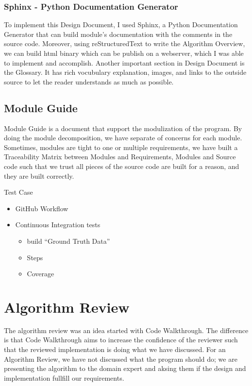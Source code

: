 \subsubsection{Sphinx - Python Documentation Generator}
To implement this Design Document, I used Sphinx, a Python Documentation Generator that can build module's documentation with the comments in the source code. Moreover, using reStructuredText to write the Algorithm Overview, we can build html binary which can be publish on a webserver, which I was able to implement and accomplish. Another important section in Design Document is the Glossary. It has rich vocubulary explanation, images, and links to the outside source to let the reader understands as much as possible.

\subsection{Module Guide}
Module Guide is a document that support the modulization of the program. By doing the module decomposition, we have separate of concerns for each module. Sometimes, modules are tight to one or multiple requirements, we have built a Traceability Matrix between Modules and Requirements, Modules and Source code such that we trust all pieces of the source code are built for a reason, and they are built correctly.


Test Case
\begin{itemize}
\item GitHub Workflow
\item Continuous Integration tests
\begin{itemize}
\item build ``Ground Truth Data''
\item Steps
\item Coverage
\end{itemize}
\end{itemize}

\section{Algorithm Review}

The algorithm review was an idea started with Code Walkthrough. The difference is that Code Walkthrough aims to increase the confidence of the reviewer such that the reviewed implementation is doing what we have discussed. For an Algorithm Review, we have not discussed what the program should do; we are presenting the algorithm to the domain expert and aksing them if the design and implementation fullfill our requirements.

